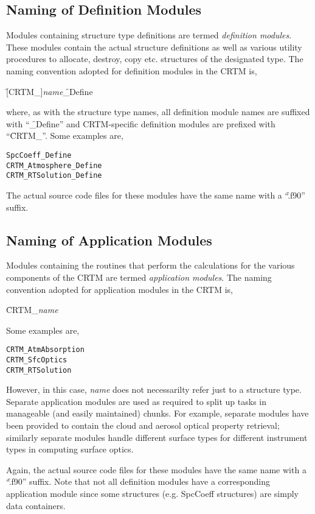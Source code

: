 \subsection{Naming of Definition Modules}
Modules containing structure type definitions are termed \textit{definition modules}. These modules contain the actual structure definitions as well as various utility procedures to allocate, destroy, copy etc. structures of the designated type. The naming convention adopted for definition modules in the CRTM is, 

\hspace{0.5cm}\f{[CRTM\_]}\textit{name}\f{\_Define} 

where, as with the structure type names, all definition module names are suffixed with ``\f{\_Define}'' and CRTM-specific definition modules are prefixed with ``\f{CRTM\_}''. Some examples are,
\begin{alltt}
  SpcCoeff_Define
  CRTM_Atmosphere_Define
  CRTM_RTSolution_Define\end{alltt}
The actual source code files for these modules have the same name with a ``\f{.f90}'' suffix.


\subsection{Naming of Application Modules}
Modules containing the routines that perform the calculations for the various components of the CRTM are termed \textit{application modules}. The naming convention adopted for application modules in the CRTM is, 

\hspace{0.5cm}\f{CRTM\_}\textit{name}

Some examples are,
\begin{alltt}
  CRTM_AtmAbsorption
  CRTM_SfcOptics
  CRTM_RTSolution\end{alltt}
However, in this case, \textit{name} does not necessarilty refer just to a structure type. Separate application modules are used as required to split up tasks in manageable (and easily maintained) chunks. For example, separate modules have been provided to contain the cloud and aerosol optical property retrieval; similarly separate modules handle different surface types for different instrument types in computing surface optics.

Again, the actual source code files for these modules have the same name with a ``\f{.f90}'' suffix. Note that not all definition modules have a corresponding application module since some structures (e.g. SpcCoeff structures) are simply data containers.


